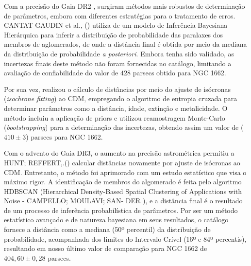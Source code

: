 \documentclass[12pt]{projeto}
\begin{document}
Com a precisão do Gaia DR2 \cite{gaia_collaboration_gaia_2018}, surgiram métodos mais robustos de determinação de parâmetros, embora com diferentes estratégias para o tratamento de erros. CANTAT-GAUDIN et al., (\citeyear{cantat-gaudin_painting_2020}) utiliza de um modelo de Inferência Bayesiana Hierárquica para inferir a distribuição de probabilidade das paralaxes dos membros de aglomerados, de onde a distância final é obtida por meio da mediana da distribuição de probabilidade \textit{a posteriori}. Embora tenha sido validado, as incertezas finais deste método não foram fornecidas no catálogo, limitando a avaliação de confiabilidade do valor de \(428\) parsecs obtido para NGC 1662.

Por sua vez, \cite{dias_updated_2021} realizou o cálculo de distâncias por meio do ajuste de isócronas (\textit{isochrone fitting}) ao CDM, empregando o algoritmo de entropia cruzada para determinar parâmetros como a distância, idade, extinção e metalicidade. O método incluiu a aplicação de priors e utilizou reamostragem Monte-Carlo (\textit{bootstrapping}) para a determinação das incertezas, obtendo assim um valor de (\(410 \pm 3\)) parsecs para NGC 1662.

Com o advento do Gaia DR3, o aumento na precisão astrométrica permitiu a HUNT; REFFERT,.(\citeyear{hunt_improving_2024}) calcular distâncias novamente por ajuste de isócronas ao CDM. Entretanto, o método foi aprimorado com um estudo estatístico que visa o máximo rigor. A identificação de membros do algomerado é feita pelo algoritmo HDBSCAN (Hierarchical Density-Based Spatial Clustering of Applications with Noise - CAMPELLO; MOULAVI; SAN-
DER \citeyear{campello_density-based_2013}), e a distância final é o resultado de um processo de inferência probabilística de parâmetros. Por ser um método estatístico avançado e de natureza bayesiana em seus resultados, o catálogo fornece a distância como a mediana (50º percentil) da distribuição de probabilidade, acompanhada dos limites do Intervalo Crível (16º e 84º percentis), resultando em nosso último valor de comparação para NGC 1662 de \(404,60 \pm  0,28\) parsecs. 
\end{document}

